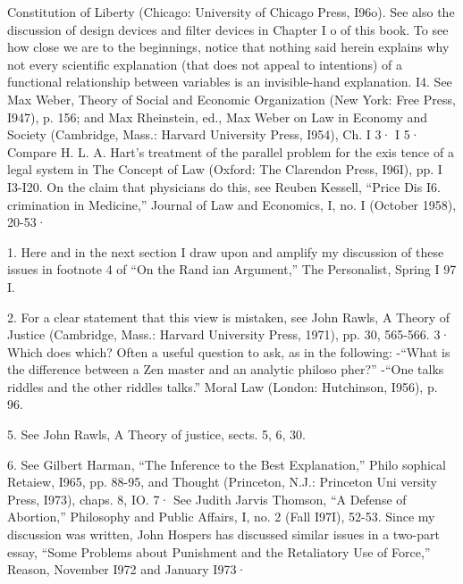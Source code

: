 \documentclass[11pt,openany]{book}
\begin{document}
{Constitution of Liberty (Chicago: University of Chicago Press, I96o). See also the discussion of design devices and filter devices in Chapter I o of this book. To see how close we are to the beginnings, notice that nothing said herein explains why not every scientific explanation (that does not appeal to intentions) of a functional relationship between variables is an invisible-hand explanation. I4. See Max Weber, Theory of Social and Economic Organization (New York: Free Press, I947), p. 156; and Max Rheinstein, ed., Max Weber on Law in Economy and Society (Cambridge, Mass.: Harvard University Press, I954), Ch. I 3· I 5· Compare H. L. A. Hart's treatment of the parallel problem for the exis tence of a legal system in The Concept of Law (Oxford: The Clarendon Press, I96I), pp. I I3-I20. On the claim that physicians do this, see Reuben Kessell, ``Price Dis I6. crimination in Medicine,'' Journal of Law and Economics, I, no. I (October 1958), 20-53·\par

1. Here and in the next section I draw upon and amplify my discussion of these issues in footnote 4 of ``On the Rand ian Argument,'' The Personalist, Spring I 97 I.\par

2. For a clear statement that this view is mistaken, see John Rawls, A Theory of Justice (Cambridge, Mass.: Harvard University Press, 1971), pp. 30, 565-566. 3· Which does which? Often a useful question to ask, as in the following: -``What is the difference between a Zen master and an analytic philoso pher?'' -``One talks riddles and the other riddles talks.'' Moral Law (London: Hutchinson, I956), p. 96.\par

5. See John Rawls, A Theory of justice, sects. 5, 6, 30.\par

6. See Gilbert Harman, ``The Inference to the Best Explanation,'' Philo sophical Retaiew, I965, pp. 88-95, and Thought (Princeton, N.J.: Princeton Uni versity Press, I973), chaps. 8, IO. 7· See Judith Jarvis Thomson, ``A Defense of Abortion,'' Philosophy and Public Affairs, I, no. 2 (Fall I97I), 52-53. Since my discussion was written, John Hospers has discussed similar issues in a two-part essay, ``Some Problems about Punishment and the Retaliatory Use of Force,'' Reason, November I972 and January I973·\par

}
\end{document}
